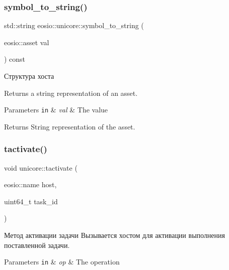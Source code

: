 \subsubsection{\texorpdfstring{symbol\+\_\+to\+\_\+string()}{symbol\_to\_string()}}
{\footnotesize\ttfamily std\+::string eosio\+::unicore\+::symbol\+\_\+to\+\_\+string (\begin{DoxyParamCaption}\item[{eosio\+::asset}]{val }\end{DoxyParamCaption}) const}



Структура хоста 

Returns a string representation of an asset.


\begin{DoxyParams}[1]{Parameters}
\mbox{\tt in}  & {\em val} & The value\\
\hline
\end{DoxyParams}
\begin{DoxyReturn}{Returns}
String representation of the asset. 
\end{DoxyReturn}
\mbox{\label{classeosio_1_1unicore_a0c35d9830c0c05c8f13be48b8cbdf236}} 
\subsubsection{\texorpdfstring{tactivate()}{tactivate()}}
{\footnotesize\ttfamily void unicore\+::tactivate (\begin{DoxyParamCaption}\item[{eosio\+::name}]{host,  }\item[{uint64\+\_\+t}]{task\+\_\+id }\end{DoxyParamCaption})}



Метод активации задачи Вызывается хостом для активации выполнения поставленной задачи. 


\begin{DoxyParams}[1]{Parameters}
\mbox{\tt in}  & {\em op} & The operation \\
\hline
\end{DoxyParams}
\mbox{\label{classeosio_1_1unicore_a725477908310816ec80cddbf733af04b}} 
